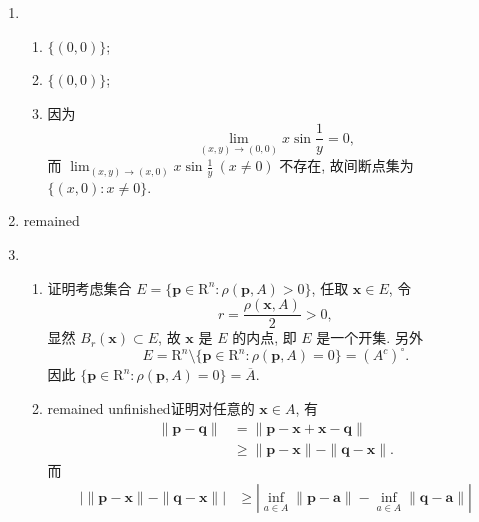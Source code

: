 % 
\begin{enumerate}
    \item %
        \begin{enumerate}[(1)]
            \item %
                $\{(0,0)\}$;
            \item %
                $\{(0,0)\}$;
            \item %
                因为
                \[
                    \lim_{(x,y)\to(0,0)}x\sin\frac1y = 0,    
                \]
                而 $\lim_{(x,y)\to(x,0)}x\sin\frac1y\ (x \neq 0)$ 不存在, 故间断点集为 $\{(x,0) : x \neq 0\}$.
        \end{enumerate}
    \item %
        {\color{red} remained}
    \item %
        \begin{enumerate}[(1)]
            \item %
                {\heiti 证明}\quad 考虑集合 $E = \{\boldsymbol{p} \in \mathrm{R}^n : \rho(\boldsymbol{p}, A) > 0\}$, 任取 $\boldsymbol{x} \in E$, 令
                \[
                    r = \frac{\rho(\boldsymbol{x}, A)}{2} > 0,    
                \]
                显然 $B_r(\boldsymbol{x}) \subset E$, 故 $\boldsymbol{x}$ 是 $E$ 的内点, 即 $E$ 是一个开集. 另外
                \[
                    E = \mathrm{R}^n \setminus \{\boldsymbol{p} \in \mathrm{R}^n : \rho(\boldsymbol{p}, A) = 0\} = (A^c)^\circ.    
                \]
                因此 $\{\boldsymbol{p} \in \mathrm{R}^n : \rho(\boldsymbol{p}, A) = 0\} = \overline{A}$.
            \item %
                {\color{red} remained unfinished}{\heiti 证明}\quad 对任意的 $\boldsymbol{x} \in A$, 有
                \begin{align*}
                    \|\boldsymbol{p} - \boldsymbol{q}\| &= \|\boldsymbol{p} - \boldsymbol{x} + \boldsymbol{x} - \boldsymbol{q}\| \\
                    &\geqslant \|\boldsymbol{p} - \boldsymbol{x}\| - \|\boldsymbol{q} - \boldsymbol{x}\|.
                \end{align*}
                而
                \begin{align*}
                    |\|\boldsymbol{p} - \boldsymbol{x}\| - \|\boldsymbol{q} - \boldsymbol{x}\|| &\geqslant |\inf_{a\in A}\|\boldsymbol{p} - \boldsymbol{a}\| - \inf_{a\in A}\|\boldsymbol{q} - \boldsymbol{a}\|| \\

\end{align*}
\end{enumerate}
\end{enumerate}
